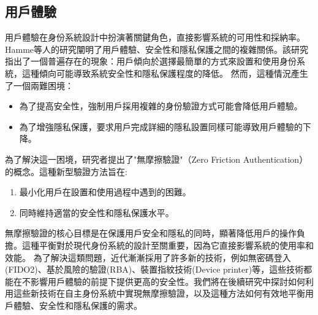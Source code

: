 \subsection{用戶體驗}
用戶體驗在身份系統設計中扮演著關鍵角色，直接影響系統的可用性和採納率。Hamme等人\cite{inproceedings}的研究闡明了用戶體驗、安全性和隱私保護之間的複雜關係。該研究指出了一個普遍存在的現象：用戶傾向於選擇最簡單的方式來設置和使用身份系統，這種傾向可能導致系統安全性和隱私保護程度的降低。
然而，這種情況產生了一個兩難困境：
\begin{itemize}
  \item 為了提高安全性，強制用戶採用複雜的身份驗證方式可能會降低用戶體驗。
  \item 為了增強隱私保護，要求用戶完成詳細的隱私設置同樣可能導致用戶體驗的下降。
\end{itemize}
為了解決這一困境，研究者提出了"無摩擦驗證"（Zero Friction Authentication）的概念。這種新型驗證方法旨在:
\begin{enumerate}
  \item 最小化用戶在設置和使用過程中遇到的困難。
  \item 同時維持適當的安全性和隱私保護水平。
\end{enumerate}
無摩擦驗證的核心目標是在保護用戶安全和隱私的同時，顯著降低用戶的操作負擔。這種平衡對於現代身份系統的設計至關重要，因為它直接影響系統的使用率和效能。
為了解決這類問題，近代漸漸採用了許多新的技術，例如無密碼登入(FIDO2)、基於風險的驗證(RBA)、裝置指紋技術(Device printer)等，這些技術都能在不影響用戶體驗的前提下提供更高的安全性。我們將在後續研究中探討如何利用這些新技術在自主身份系統中實現無摩擦驗證，以及這種方法如何有效地平衡用戶體驗、安全性和隱私保護的需求。
